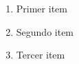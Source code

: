 \documentclass{article}
\begin{document}
\renewcommand\theenumi{{\bfseries\arabic{enumi}}}
\renewcommand\labelenumi{
  \tikz[baseline=-3pt]\node[fill=cyan]{\theenumi};
}


\begin{enumerate}
  \item Primer item
  \item Segundo item
  \item Tercer item
\end{enumerate}
\end{document}
